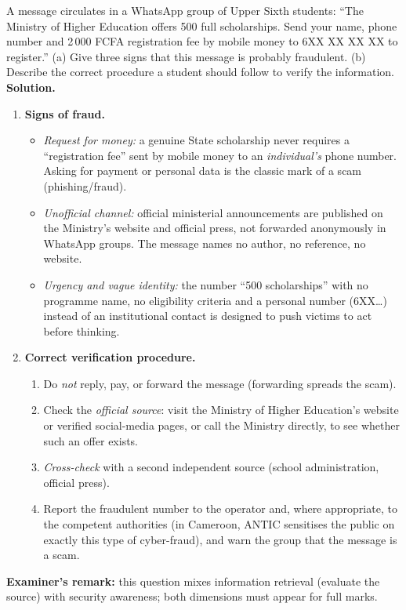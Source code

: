 \documentclass[11pt]{article}
\newcommand{\cle}[1]{{\popxbold\color{popdark}#1}}
\begin{document}
\begin{exoresolu}
A message circulates in a WhatsApp group of Upper Sixth students: ``The Ministry of Higher Education offers 500 full scholarships. Send your name, phone number and 2\,000 FCFA registration fee by mobile money to 6XX XX XX XX to register.'' (a) Give three signs that this message is probably fraudulent. (b) Describe the correct procedure a student should follow to verify the information.
\tcblower
\textbf{Solution.}
\begin{enumerate}
\item[(a)] \textbf{Signs of fraud.}
\begin{itemize}
\item \emph{Request for money:} a genuine State scholarship never requires a ``registration fee'' sent by mobile money to an \emph{individual's} phone number. Asking for payment or personal data is the classic mark of a scam (\cle{phishing}/fraud).
\item \emph{Unofficial channel:} official ministerial announcements are published on the Ministry's website and official press, not forwarded anonymously in WhatsApp groups. The message names no author, no reference, no website.
\item \emph{Urgency and vague identity:} the number ``500 scholarships'' with no programme name, no eligibility criteria and a personal number (6XX\ldots) instead of an institutional contact is designed to push victims to act before thinking.
\end{itemize}
\item[(b)] \textbf{Correct verification procedure.}
\begin{enumerate}
\item Do \emph{not} reply, pay, or forward the message (forwarding spreads the scam).
\item Check the \emph{official source}: visit the Ministry of Higher Education's website or verified social-media pages, or call the Ministry directly, to see whether such an offer exists.
\item \emph{Cross-check} with a second independent source (school administration, official press).
\item Report the fraudulent number to the operator and, where appropriate, to the competent authorities (in Cameroon, ANTIC sensitises the public on exactly this type of cyber-fraud), and warn the group that the message is a scam.
\end{enumerate}
\end{enumerate}
\textbf{Examiner's remark:} this question mixes information retrieval (evaluate the source) with security awareness; both dimensions must appear for full marks.
\end{exoresolu}
\end{document}
